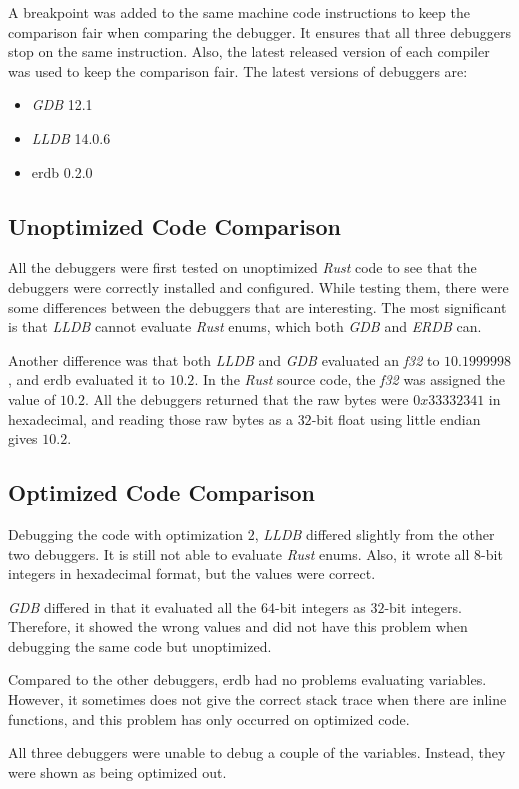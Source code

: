 A breakpoint was added to the same machine code instructions to keep the comparison fair when comparing the debugger.
It ensures that all three debuggers stop on the same instruction.
Also, the latest released version of each compiler was used to keep the comparison fair.
The latest versions of debuggers are:


\begin{itemize}
    \item \emph{GDB} 12.1
    \item \emph{LLDB} 14.0.6
    \item \gls{erdb} 0.2.0 %
\end{itemize}




\subsection{Unoptimized Code Comparison}
All the debuggers were first tested on unoptimized \emph{Rust} code to see that the debuggers were correctly installed and configured.
While testing them, there were some differences between the debuggers that are interesting.
The most significant is that \emph{LLDB} cannot evaluate \emph{Rust} enums, which both \emph{GDB} and \emph{ERDB} can.


Another difference was that both \emph{LLDB} and \emph{GDB} evaluated an \emph{f32} to $10.1999998$, and \gls{erdb} evaluated it to $10.2$.
In the \emph{Rust} source code, the \emph{f32} was assigned the value of $10.2$.
All the debuggers returned that the raw bytes were $0x33332341$ in hexadecimal, and reading those raw bytes as a $32$-bit float using little endian gives $10.2$.



\subsection{Optimized Code Comparison}
Debugging the code with optimization $2$, \emph{LLDB} differed slightly from the other two debuggers.
It is still not able to evaluate \emph{Rust} enums.
Also, it wrote all $8$-bit integers in hexadecimal format, but the values were correct.


\emph{GDB} differed in that it evaluated all the $64$-bit integers as $32$-bit integers.
Therefore, it showed the wrong values and did not have this problem when debugging the same code but unoptimized.


Compared to the other debuggers, \gls{erdb} had no problems evaluating variables.
However, it sometimes does not give the correct stack trace when there are inline functions, and this problem has only occurred on optimized code.


All three debuggers were unable to debug a couple of the variables.
Instead, they were shown as being optimized out.

